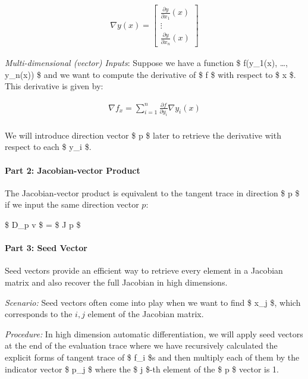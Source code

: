 \documentclass[11pt]{article}
\begin{document}
\[
\begin{align}
\nabla y(x) =
\begin{bmatrix}
{\frac {\partial y}{\partial x_{1}}}(x)
\\
\vdots 
\\
{\frac {\partial y}{\partial x_{n}}}(x)
\end{bmatrix}
\end{align}
\]

\emph{Multi-dimensional (vector) Inputs}: Suppose we have a function \$
f(y\_1(x), \ldots{}, y\_n(x)) \$ and we want to compute the derivative
of \$ f \$ with respect to \$ x \$. This derivative is given by:

\[
\begin{align}
\nabla f_x = \sum_{i=1}^n \frac{\partial f}{\partial y_i} \nabla y_i(x)\\
\end{align}
\]

We will introduce direction vector \$ p \$ later to retrieve the
derivative with respect to each \$ y\_i \$.

\hypertarget{part-2-jacobian-vector-product}{%
\paragraph{Part 2: Jacobian-vector
Product}\label{part-2-jacobian-vector-product}}

The Jacobian-vector product is equivalent to the tangent trace in
direction \$ p \$ if we input the same direction vector \(p\):

\$ D\_p v \$ = \$ J p \$

\hypertarget{part-3-seed-vector}{%
\paragraph{Part 3: Seed Vector}\label{part-3-seed-vector}}

Seed vectors provide an efficient way to retrieve every element in a
Jacobian matrix and also recover the full Jacobian in high dimensions.

\emph{Scenario:} Seed vectors often come into play when we want to find
\$  {\partial x_j} \$, which corresponds to the
\(i, j\) element of the Jacobian matrix.

\emph{Procedure:} In high dimension automatic differentiation, we will
apply seed vectors at the end of the evaluation trace where we have
recursively calculated the explicit forms of tangent trace of \$ f\_i
\$s and then multiply each of them by the indicator vector \$ p\_j \$
where the \$ j \$-th element of the \$ p \$ vector is 1.
\end{document}
